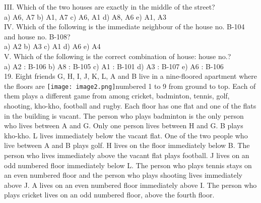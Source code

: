 \documentclass[
]{article}
\begin{document}
III. Which of the two houses are exactly in the middle of the street?\\
a) A6, A7 \hspace{2mm}b) A1, A7 \hspace{2mm}c) A6, A1 \hspace{2mm}d) A8, A6 \hspace{2mm}e) A1, A3\\

IV. Which of the following is the immediate neighbour of the house no. B-104 and house no.
B-108?\\
a) A2 \hspace{2mm}b) A3 \hspace{2mm}c) A1 \hspace{2mm}d) A6 \hspace{2mm}e) A4\\

V. Which of the following is the correct combination of house: house no.?\\
a) A2 : B-106 \hspace{2mm}b) A8 : B-105 \hspace{2mm}c) A1 : B-101
\hspace{2mm}d) A3 : B-107 \hspace{2mm}e) A6 : B-106\\

19. Eight friends G, H, I, J, K, L, A and B live in a nine-floored apartment where the floors are
 \texttt{[image: image2.png]}numbered 1 to 9 from ground to top. Each of them plays a different game from among
cricket, badminton, tennis, golf, shooting, kho-kho, football and rugby. Each floor has one
flat and one of the flats in the building is vacant. The person who plays badminton is the
only person who lives between A and G. Only one person lives between H and G. B plays
kho-kho. L lives immediately below the vacant flat. One of the two people who live between
A and B plays golf. H lives on the floor immediately below B. The person who lives
immediately above the vacant flat plays football. J lives on an odd numbered floor
immediately below L. The person who plays tennis stays on an even numbered floor and
the person who plays shooting lives immediately above J. A lives on an even numbered
floor immediately above I. The person who plays cricket lives on an odd numbered floor,
above the fourth floor.\\
\end{document}
